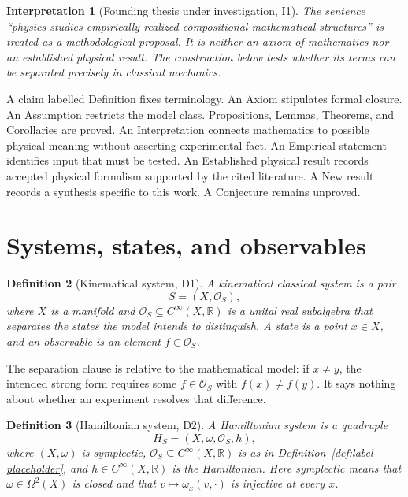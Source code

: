 \documentclass[11pt]{article}
\newtheorem{definition}{Definition}[section]
\newtheorem{interpretation}[definition]{Interpretation}
\newcommand{\R}{\mathbb{R}}
\newcommand{\Obs}{\mathcal{O}}
\begin{document}
\begin{interpretation}[Founding thesis under investigation, I1]
The sentence ``physics studies empirically realized compositional mathematical structures'' is treated as a methodological proposal. It is neither an axiom of mathematics nor an established physical result. The construction below tests whether its terms can be separated precisely in classical mechanics.
\end{interpretation}

A claim labelled Definition fixes terminology. An Axiom stipulates formal closure. An Assumption restricts the model class. Propositions, Lemmas, Theorems, and Corollaries are proved. An Interpretation connects mathematics to possible physical meaning without asserting experimental fact. An Empirical statement identifies input that must be tested. An Established physical result records accepted physical formalism supported by the cited literature. A New result records a synthesis specific to this work. A Conjecture remains unproved.

\section{Systems, states, and observables}

\begin{definition}[Kinematical system, D1]
A \emph{kinematical classical system} is a pair
\[
 S=(X,\Obs_S),
\]
where $X$ is a manifold and $\Obs_S\subseteq C^\infty(X,\R)$ is a unital real subalgebra that separates the states the model intends to distinguish. A \emph{state} is a point $x\in X$, and an \emph{observable} is an element $f\in\Obs_S$.
\end{definition}

The separation clause is relative to the mathematical model: if $x\ne y$, the intended strong form requires some $f\in\Obs_S$ with $f(x)\ne f(y)$. It says nothing about whether an experiment resolves that difference.

\begin{definition}[Hamiltonian system, D2]
A \emph{Hamiltonian system} is a quadruple
\[
 H_S=(X,\omega,\Obs_S,h),
\]
where $(X,\omega)$ is symplectic, $\Obs_S\subseteq C^\infty(X,\R)$ is as in Definition~\ref{def:label-placeholder}, and $h\in C^\infty(X,\R)$ is the Hamiltonian. Here symplectic means that $\omega\in\Omega^2(X)$ is closed and that $v\mapsto\omega_x(v,\cdot)$ is injective at every $x$.
\end{definition}
\end{document}
